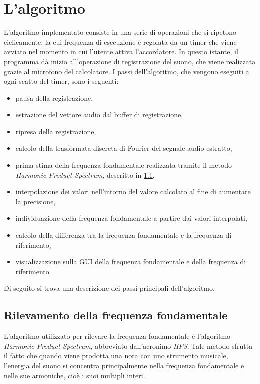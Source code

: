 \chapter{L'algoritmo}

L'algoritmo implementato consiste in una serie di operazioni che si ripetono ciclicamente, la cui frequenza di esecuzione è regolata da un timer che viene avviato nel momento in cui l'utente attiva l'accordatore.
In questo istante, il programma dà inizio all'operazione di registrazione del suono, che viene realizzata grazie al microfono del calcolatore. 
I passi dell'algoritmo, che vengono eseguiti a ogni scatto del timer, sono i seguenti:
\begin{itemize}
	\item pausa della registrazione,
	\item estrazione del vettore audio dal buffer di registrazione, 
	\item ripresa della registrazione,
	\item calcolo della trasformata discreta di Fourier del segnale audio estratto,
	\item prima stima della frequenza fondamentale realizzata tramite il metodo \emph{Harmonic Product Spectrum}, descritto in \ref{cap:rilevamento_frequenza},
	\item interpolazione dei valori nell'intorno del valore calcolato al fine di aumentare la precisione,
	\item individuazione della frequenza fondamentale a partire dai valori interpolati,
	\item calcolo della differenza tra la frequenza fondamentale e la frequenza di riferimento,
	\item visualizzazione sulla GUI della frequenza fondamentale e della frequenza di riferimento.
\end{itemize}

Di seguito si trova una descrizione dei passi principali dell'algoritmo.

	\section{Rilevamento della frequenza fondamentale}\label{cap:rilevamento_frequenza}
	L'algoritmo utilizzato per rilevare la frequenza fondamentale è l'algoritmo \emph{Harmonic Product Spectrum}, abbreviato dall'acronimo \emph{HPS}.
	Tale metodo sfrutta il fatto che quando viene prodotta una nota con uno strumento musicale, l'energia del suono si concentra principalmente nella frequenza fondamentale e nelle sue armoniche, cioè i suoi multipli interi.

